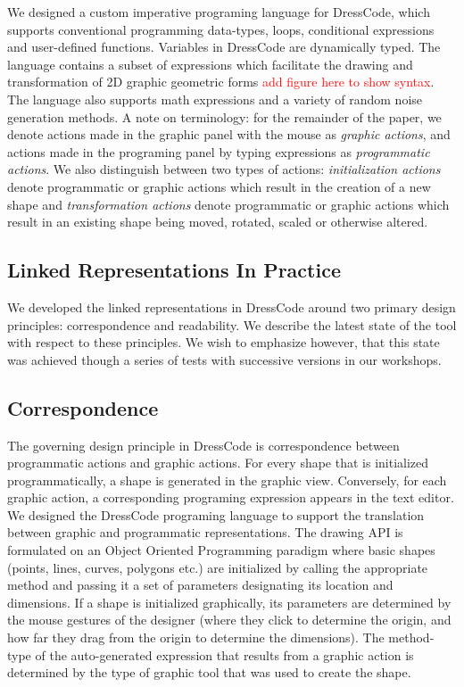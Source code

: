 \documentclass{sigchi}
\begin{document}
We designed a custom imperative programing language for DressCode, which supports conventional programming data-types, loops, conditional expressions and user-defined functions. Variables in DressCode are dynamically typed. The language contains a subset of expressions which facilitate the drawing and transformation of 2D graphic geometric forms \textcolor{red}{add figure here to show syntax}. The language also supports math expressions and a variety of random noise generation methods. A note on terminology: for the remainder of the paper, we denote actions made in the graphic panel with the mouse as \textit{graphic actions}, and actions made in the programing panel by typing expressions as \textit{programmatic actions}. We also distinguish between two types of actions: \textit{initialization actions} denote programmatic or graphic actions which result in the creation of a new shape and \textit{transformation actions} denote programmatic or graphic actions which result in an existing shape being moved, rotated, scaled or otherwise altered.


\subsection{Linked Representations In Practice}
We developed the linked representations in DressCode around two primary design principles: correspondence and readability. We describe the latest state of the tool with respect to these principles. We wish to emphasize however, that this state was achieved though a series of tests with successive versions in our workshops.

\subsection{Correspondence}
\label{subsec:correspondence}
The governing design principle in DressCode is correspondence between programmatic actions and graphic actions. For every shape that is initialized programmatically, a shape is generated in the graphic view. Conversely, for each graphic action, a corresponding programing expression appears in the text editor. We designed the DressCode programing language to support the translation between graphic and programmatic representations. The drawing API is formulated on an Object Oriented Programming paradigm where basic shapes (points, lines, curves, polygons etc.) are initialized by calling the appropriate method and passing it a set of parameters designating its location and dimensions. If a shape is initialized graphically, its parameters are determined by the mouse gestures of the designer (where they click to determine the origin, and how far they drag from the origin to determine the dimensions). The method-type of the auto-generated expression that results from a graphic action is determined by the type of graphic tool that was used to create the shape.
\end{document}
